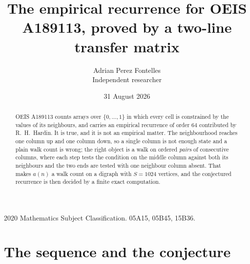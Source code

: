 \documentclass[11pt,a4paper]{article}
\title{The empirical recurrence for OEIS A189113, proved by a two-line transfer matrix}
\author{Adrian Perez Fontelles\\ \small Independent researcher}
\date{31 August 2026}
\theoremstyle{plain}
\theoremstyle{definition}
\begin{document}
\maketitle

\begin{abstract}
OEIS A189113 counts arrays over $\{0,\dots,1\}$ in which every cell is constrained by the
values of its neighbours, and carries an empirical recurrence of order $64$ contributed
by R.~H.~Hardin. It is true, and it is not an empirical matter. The neighbourhood reaches one
column up and one column down, so a single column is not enough state and a plain walk count
is wrong; the right object is a walk on ordered \emph{pairs} of consecutive columns, where
each step tests the condition on the middle column against both its neighbours and the two
ends are tested with one neighbour column absent. That makes $a(n)$ a walk count on a digraph
with $S=1024$ vertices, and the conjectured recurrence is then decided by a finite exact
computation.
\end{abstract}

\noindent\small 2020 Mathematics Subject Classification. 05A15, 05B45, 15B36.\normalsize

\section{The sequence and the conjecture}
\end{document}

